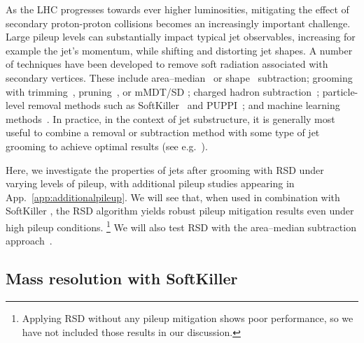 \documentclass[11pt,a4paper]{article}
\DeclareRobustCommand{\App}[1]{App.~\ref{#1}}
\begin{document}
As the LHC progresses towards ever higher luminosities, mitigating the
effect of secondary proton-proton collisions becomes an
increasingly important challenge.
%
Large pileup levels can substantially impact typical jet observables,
increasing for example the jet's momentum, while shifting and
distorting jet shapes.
%
A number of techniques have been developed to remove soft
radiation associated with secondary vertices.
%
These include area--median~\cite{Cacciari:2007fd,Cacciari:2008gn} or
shape~\cite{Soyez:2012hv} subtraction; grooming with
trimming~\cite{Krohn:2009th}, pruning~\cite{Ellis:2009me}, or mMDT/SD
\cite{Dasgupta:2013ihk,Larkoski:2014wba}; charged hadron
subtraction~\cite{CMS:2009nxa}; particle-level removal methods
such as SoftKiller~\cite{Cacciari:2014gra} and
PUPPI~\cite{Bertolini:2014bba}; and machine learning
methods~\cite{Komiske:2017ubm}.
%
In practice, in the context of jet substructure, it is generally most
useful to combine a removal or subtraction method with some type of
jet grooming to achieve optimal results (see
e.g.~\cite{Altheimer:2013yza}).

Here, we investigate the properties of jets after grooming with
RSD under varying levels of pileup, with additional pileup studies appearing in \App{app:additionalpileup}.
%
We will see that, when used in combination with SoftKiller
\cite{Cacciari:2014gra}, the RSD algorithm yields robust pileup mitigation
results even under high pileup conditions.%
\footnote{Applying RSD without any pileup mitigation shows poor performance, so we have not included those results in our discussion.}
%
We will also test RSD with the area--median subtraction approach~\cite{Cacciari:2007fd}.


\subsection{Mass resolution with SoftKiller}
\label{sec:mass_PU}
\end{document}
